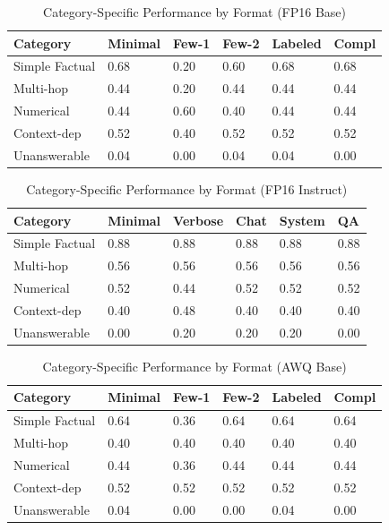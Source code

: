 \documentclass[11pt,a4paper]{article}
\begin{document}
\begin{table}[H]
\centering
\caption{Category-Specific Performance by Format (FP16 Base)}
\small
\begin{tabularx}{\textwidth}{@{}X C{1.4cm} C{1.4cm} C{1.4cm} C{1.4cm} C{1.4cm}@{}}
\toprule
\textbf{Category} & \textbf{Minimal} & \textbf{Few-1} & \textbf{Few-2} & \textbf{Labeled} & \textbf{Compl} \\
\midrule
Simple Factual & 0.68 & 0.20 & 0.60 & 0.68 & 0.68 \\
Multi-hop & 0.44 & 0.20 & 0.44 & 0.44 & 0.44 \\
Numerical & 0.44 & 0.60 & 0.40 & 0.44 & 0.44 \\
Context-dep & 0.52 & 0.40 & 0.52 & 0.52 & 0.52 \\
Unanswerable & 0.04 & 0.00 & 0.04 & 0.04 & 0.00 \\
\bottomrule
\end{tabularx}
\end{table}

\begin{table}[H]
\centering
\caption{Category-Specific Performance by Format (FP16 Instruct)}
\small
\begin{tabularx}{\textwidth}{@{}X C{1.4cm} C{1.4cm} C{1.4cm} C{1.4cm} C{1.4cm}@{}}
\toprule
\textbf{Category} & \textbf{Minimal} & \textbf{Verbose} & \textbf{Chat} & \textbf{System} & \textbf{QA} \\
\midrule
Simple Factual & 0.88 & 0.88 & 0.88 & 0.88 & 0.88 \\
Multi-hop & 0.56 & 0.56 & 0.56 & 0.56 & 0.56 \\
Numerical & 0.52 & 0.44 & 0.52 & 0.52 & 0.52 \\
Context-dep & 0.40 & 0.48 & 0.40 & 0.40 & 0.40 \\
Unanswerable & 0.00 & 0.20 & 0.20 & 0.20 & 0.00 \\
\bottomrule
\end{tabularx}
\end{table}

\begin{table}[H]
\centering
\caption{Category-Specific Performance by Format (AWQ Base)}
\small
\begin{tabularx}{\textwidth}{@{}X C{1.4cm} C{1.4cm} C{1.4cm} C{1.4cm} C{1.4cm}@{}}
\toprule
\textbf{Category} & \textbf{Minimal} & \textbf{Few-1} & \textbf{Few-2} & \textbf{Labeled} & \textbf{Compl} \\
\midrule
Simple Factual & 0.64 & 0.36 & 0.64 & 0.64 & 0.64 \\
Multi-hop & 0.40 & 0.40 & 0.40 & 0.40 & 0.40 \\
Numerical & 0.44 & 0.36 & 0.44 & 0.44 & 0.44 \\
Context-dep & 0.52 & 0.52 & 0.52 & 0.52 & 0.52 \\
Unanswerable & 0.04 & 0.00 & 0.00 & 0.04 & 0.00 \\
\bottomrule
\end{tabularx}
\end{table}
\end{document}
